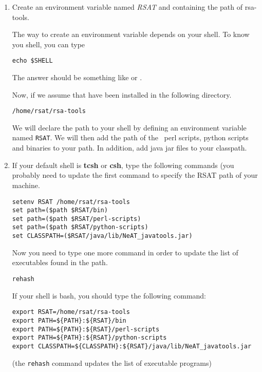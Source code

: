 \begin{enumerate}

\item Create an environment variable named \textit{RSAT} and
  containing the path of rsa-tools.

  The way to create an environment variable depends on your shell. To
  know you shell, you can type

\lstset{language=csh}

\begin{lstlisting}
echo $SHELL
\end{lstlisting}

The answer should be something like  or
.

Now, if we assume that \RSAT have been installed in the following
directory.

\begin{lstlisting}
/home/rsat/rsa-tools
\end{lstlisting}


We will declare the \RSAT path to your shell by defining an
environment variable named \texttt{RSAT}.  We will then add the path
of the \RSAT \ perl scripts, python scripts and binaries to your
path. In addition, add java jar files to your classpath.

\item If your default shell is \textbf{tcsh} or \textbf{csh}, type the
  following commands (you probably need to update the first command to
  specify the RSAT path of your machine.

\begin{lstlisting}
setenv RSAT /home/rsat/rsa-tools
set path=($path $RSAT/bin)
set path=($path $RSAT/perl-scripts)
set path=($path $RSAT/python-scripts)
set CLASSPATH=($RSAT/java/lib/NeAT_javatools.jar)
\end{lstlisting}

Now you need to type one more command in order to update the list of
executables found in the path.

\begin{lstlisting}
rehash
\end{lstlisting}


If your shell is bash, you should type the following command:

\begin{lstlisting}
export RSAT=/home/rsat/rsa-tools
export PATH=${PATH}:${RSAT}/bin
export PATH=${PATH}:${RSAT}/perl-scripts
export PATH=${PATH}:${RSAT}/python-scripts
export CLASSPATH=${CLASSPATH}:${RSAT}/java/lib/NeAT_javatools.jar
\end{lstlisting}



(the \texttt{rehash} command updates the list of executable programs)

\end{enumerate}

